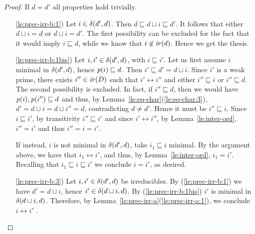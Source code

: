 \begin{proof}
If $ d = d'$ all properties hold trivially.
\begin{enumerate}
\item[\ref{le:prec-irr-b:1})] Let $i \in \delta({d'},{d})$. Then
  $d \sqsubseteq d \sqcup i \sqsubseteq d'$. It follows that either
  $d \sqcup i = d$ or $d \sqcup i = d'$. The first possibility can be
  excluded for the fact that it would imply $i \sqsubseteq d$, while we
  know that $i \not\in \mathop{\mathit{ir}({d})}$. Hence we get the thesis.

\item[\ref{le:prec-irr-b:1bis})] Let $i, i' \in \delta({d'},{d})$, with
  $i \sqsubseteq i'$. Let us first assume $i$ minimal  in
  $\delta({d'},{d})$, hence $\mathit{p}({i}) \sqsubseteq d$. Then
  $i' \sqsubseteq d' = d \sqcup i$. Since $i'$ is a weak prime, there
  exists $i'' \in \mathop{\mathit{ir}({D})}$ such that {$i' \leftrightarrow i''$} 
  and either $i'' \sqsubseteq i$ or $i'' \sqsubseteq d$. The second
  possibility is excluded. In fact, if $i'' \sqsubseteq d$, then we
  would have $\mathit{p}({i}), \mathit{p}({i''}) \sqsubseteq d$ and thus, by
  Lemma~\ref{le:eq-char}(\ref{le:eq-char:3}),
  $d' = d \sqcup i = d \sqcup i'' = d$, contradicting $d \neq
  d'$. Hence it must be $i'' \sqsubseteq i$. Since
  $i \sqsubseteq i'$, by transitivity $i'' \sqsubseteq i'$ and since
  {$i' \leftrightarrow i''$}, 
  by Lemma~\ref{le:inter-ord},  $i''=i'$ and thus $i''=i=i'$.

  If instead, $i$ is not minimal in $\delta({d'},{d})$, take
  $i_1 \sqsubseteq i$ minimal. By the argument above, we have that
  $i_1 \leftrightarrow i'$, and thus, by Lemma~\ref{le:inter-ord},
  $i_1=i'$. Recalling that $i_1 \sqsubseteq i \sqsubseteq i'$ we
  conclude $i=i'$, as desired.


\item[\ref{le:prec-irr-b:3})] Let $i, i' \in \delta({d'},{d})$ be
  irreducibles. By (\ref{le:prec-irr-b:1}) we have $d' = d \sqcup i$,
  hence $i' \in \delta({d \sqcup i},{d})$. By (\ref{le:prec-irr-b:1bis})
  $i'$ is minimal in $\delta({d \sqcup i},{d})$. Therefore, by
  Lemma~\ref{le:prec-irr-a}(\ref{le:prec-irr-a:1}), we conclude
  $i \leftrightarrow i'$ .
\end{enumerate}
\end{proof}



